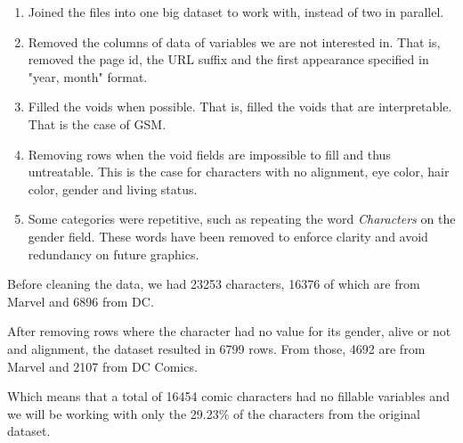  \begin{enumerate}
   \item Joined the files into one big dataset to work with,  instead of two in parallel.
      \item Removed the columns of data of variables we are not interested in. That is, removed the page id, the URL suffix and the first appearance specified in "year, month" format.
      \item Filled the voids when possible. That is, filled the voids that are interpretable. That is the case of GSM.
   \item Removing rows when the void fields are impossible to fill and thus untreatable. This is the case for characters with no alignment, eye color, hair color, gender and living status.  
   \item Some categories were repetitive, such as repeating the word \textit{Characters} on the gender field. These words have been removed to enforce clarity and avoid redundancy on future graphics.
 \end{enumerate}
 

 Before cleaning the data, we had 23253 characters, 16376 of which are from Marvel and 6896 from DC. 
 
 After removing rows where the character had no value for its gender, alive or not and alignment, the dataset resulted in 6799 rows.  From those, 4692 are from Marvel and 2107 from DC Comics.
 
 Which means that a total of 16454 comic characters had no fillable variables and we will be working with only the 29.23\% of the characters from the original dataset.


